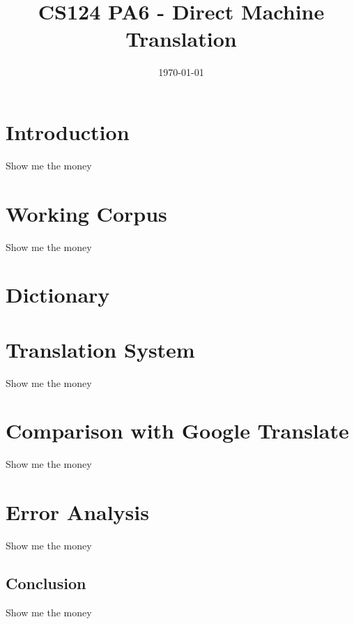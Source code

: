 \documentclass[11pt]{article} %
\begin{document}
\title{CS124 PA6 - Direct Machine Translation}
\date{\today}
\maketitle

\section{Introduction}
Show me the money

\section{Working Corpus}
Show me the money

\section{Dictionary}

\section{Translation System}
Show me the money

\section{Comparison with Google Translate}
Show me the money

\section{Error Analysis}
Show me the money

\subsection{Conclusion}
Show me the money
\end{document}
